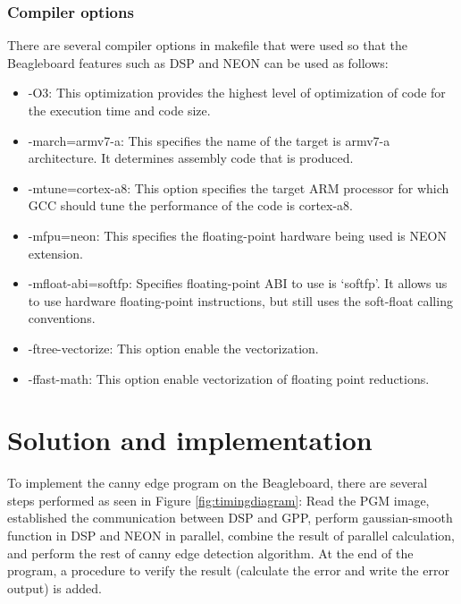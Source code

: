 \documentclass[conference]{IEEEtran}
\begin{document}
\subsubsection{Compiler options}
There are several compiler options in makefile that were used so that the Beagleboard features such as DSP and NEON can be used as follows:
\begin{itemize}
\item -O3: This optimization provides the highest level of optimization of code for the execution time and code size.
\end{itemize}
\begin{itemize}
\item -march=armv7-a: This specifies the name of the target is armv7-a architecture. It determines assembly code that is produced.
\end{itemize}
\begin{itemize}
\item -mtune=cortex-a8: This option specifies the target ARM processor for which GCC should tune the performance of the code is cortex-a8.
\end{itemize}
\begin{itemize}
\item -mfpu=neon: This specifies the floating-point hardware being used is NEON extension.
\end{itemize}
\begin{itemize}
\item -mfloat-abi=softfp: Specifies floating-point ABI to use is ‘softfp’. It allows us to use hardware floating-point instructions, but still uses the soft-float calling conventions.
\end{itemize}
\begin{itemize}
\item -ftree-vectorize: This option enable the vectorization.
\end{itemize}
\begin{itemize}
\item -ffast-math: This option enable vectorization of floating point reductions.
\end{itemize}

\section{Solution and implementation}
To implement the canny edge program on the Beagleboard, there are several steps performed as seen in Figure \ref{fig:timingdiagram}: Read the PGM image, established the communication between DSP and GPP, perform gaussian-smooth function in DSP and NEON in parallel, combine the result of parallel calculation, and perform the rest of canny edge detection algorithm. At the end of the program, a procedure to verify the result (calculate the error and write the error output) is added.
\end{document}
